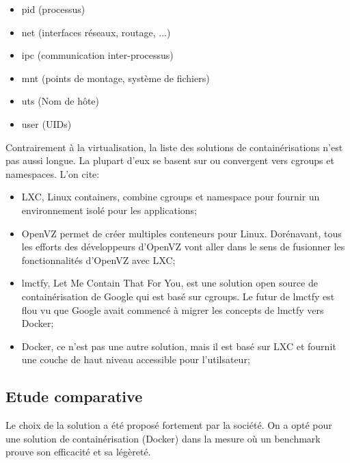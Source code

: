 \begin{onehalfspace}
\begin{itemize}
\begin{itemize}
\item pid (processus)
\item net (interfaces réseaux, routage, ...)
\item ipc (communication inter-processus)
\item mnt (points de montage, système de fichiers)
\item uts (Nom de hôte)
\item user (UIDs)
\end{itemize}

\end{itemize}


Contrairement à la virtualisation, la liste des solutions de containérisations n'est pas aussi longue. La plupart d'eux se basent sur ou convergent vers cgroups et namespaces. L'on cite:

\begin{itemize}
\item LXC, Linux containers, combine cgroups et namespace pour fournir un environnement isolé pour les applications;
\item OpenVZ permet de créer multiples conteneurs pour Linux. Dorénavant, tous les efforts des développeurs d'OpenVZ vont aller dans le sens de fusionner les fonctionnalités d'OpenVZ avec LXC;
\item lmctfy, Let Me Contain That For You, est une solution open source de containérisation de Google qui est basé sur cgroups. Le futur de lmctfy est flou vu que Google avait commencé à migrer les concepts de lmctfy vers Docker;
\item Docker, ce n'est pas une autre solution, mais il est basé sur LXC et fournit une couche de haut niveau accessible pour l'utilsateur;

\end{itemize}

\subsection{Etude comparative}

Le choix de la solution a été proposé fortement par la société. On a opté pour une solution de containérisation (Docker) dans la mesure où un benchmark prouve son efficacité et sa légèreté.



\end{onehalfspace}
